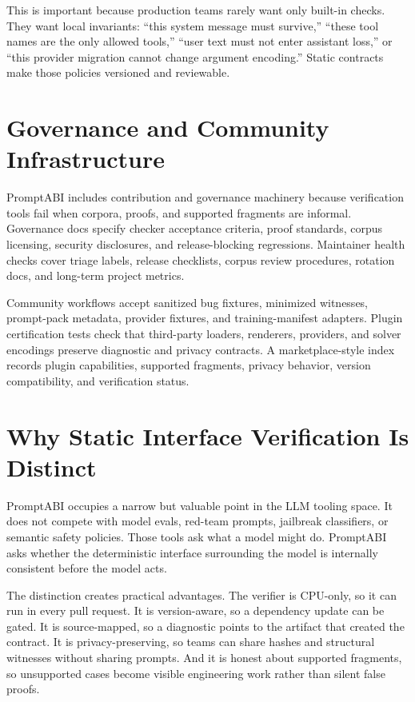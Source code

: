 \documentclass[10pt]{article}
\begin{document}
This is important because production teams rarely want only built-in checks.
They want local invariants: ``this system message must survive,'' ``these tool
names are the only allowed tools,'' ``user text must not enter assistant loss,''
or ``this provider migration cannot change argument encoding.'' Static contracts
make those policies versioned and reviewable.

\newpage
\section{Governance and Community Infrastructure}

PromptABI includes contribution and governance machinery because verification
tools fail when corpora, proofs, and supported fragments are informal.
Governance docs specify checker acceptance criteria, proof standards, corpus
licensing, security disclosures, and release-blocking regressions. Maintainer
health checks cover triage labels, release checklists, corpus review procedures,
rotation docs, and long-term project metrics.

Community workflows accept sanitized bug fixtures, minimized witnesses,
prompt-pack metadata, provider fixtures, and training-manifest adapters. Plugin
certification tests check that third-party loaders, renderers, providers, and
solver encodings preserve diagnostic and privacy contracts. A marketplace-style
index records plugin capabilities, supported fragments, privacy behavior,
version compatibility, and verification status.

\newpage
\section{Why Static Interface Verification Is Distinct}

PromptABI occupies a narrow but valuable point in the LLM tooling space. It does
not compete with model evals, red-team prompts, jailbreak classifiers, or
semantic safety policies. Those tools ask what a model might do. PromptABI asks
whether the deterministic interface surrounding the model is internally
consistent before the model acts.

The distinction creates practical advantages. The verifier is CPU-only, so it
can run in every pull request. It is version-aware, so a dependency update can
be gated. It is source-mapped, so a diagnostic points to the artifact that
created the contract. It is privacy-preserving, so teams can share hashes and
structural witnesses without sharing prompts. And it is honest about supported
fragments, so unsupported cases become visible engineering work rather than
silent false proofs.
\end{document}
